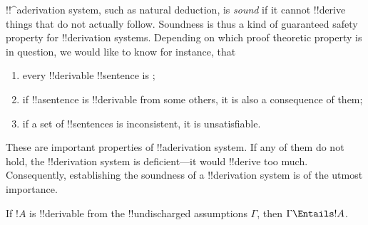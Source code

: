 \documentclass[../../../include/open-logic-section]{subfiles}
\begin{document}
      {}
      {}

\begin{explain}
!!^a{derivation} system, such as natural deduction, is \emph{sound}
if it cannot !!{derive} things that do not actually follow.  Soundness is
thus a kind of guaranteed safety property for !!{derivation} systems.
Depending on which proof theoretic property is in question, we would
like to know for instance, that
\begin{enumerate}
\item every !!{derivable} !!{sentence} is ;
\item if !!a{sentence} is !!{derivable} from some others, it is also a
  consequence of them;
\item if a set of !!{sentence}s is inconsistent, it is unsatisfiable.
\end{enumerate}
These are important properties of !!a{derivation} system. If any of
them do not hold, the !!{derivation} system is deficient---it would
!!{derive} too much.  Consequently, establishing the soundness of a
!!{derivation} system is of the utmost importance.
\end{explain}

\begin{thm}[Soundness]
If $!A$ is !!{derivable} from the !!{undischarged} assumptions
$\Gamma$, then $\Gamma \Entails !A$.
\end{thm}
\end{document}
